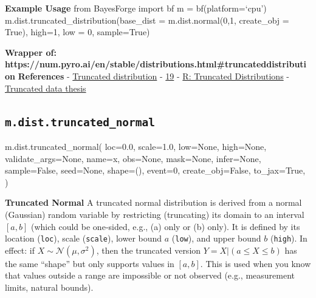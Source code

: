 \documentclass[
  letterpaper,
  DIV=11,
  numbers=noendperiod]{scrartcl}
\newenvironment{Shaded}{\begin{snugshade}}{\end{snugshade}}
\newcommand{\DecValTok}[1]{\textcolor[rgb]{0.68,0.00,0.00}{#1}}
\newcommand{\FloatTok}[1]{\textcolor[rgb]{0.68,0.00,0.00}{#1}}
\newcommand{\NormalTok}[1]{\textcolor[rgb]{0.00,0.23,0.31}{#1}}
\newcommand{\OperatorTok}[1]{\textcolor[rgb]{0.37,0.37,0.37}{#1}}
\newcommand{\StringTok}[1]{\textcolor[rgb]{0.13,0.47,0.30}{#1}}
\newcommand{\VariableTok}[1]{\textcolor[rgb]{0.07,0.07,0.07}{#1}}
\begin{document}
\textbf{Example Usage} from BayesForge import bf m = bf(platform=`cpu')
m.dist.truncated\_distribution(base\_dist = m.dist.normal(0,1,
create\_obj = True), high=1, low = 0, sample=True)

\textbf{Wrapper of:
https://num.pyro.ai/en/stable/distributions.html\#truncateddistribution}
\textbf{References} -
\href{https://en.wikipedia.org/wiki/Truncated_distribution}{Truncated
distribution} -
\href{https://pages.stern.nyu.edu/~wgreene/Text/Edition8/PDF/M19_GREE1366_08_SE_C19.pdf}{19}
-
\href{https://search.r-project.org/CRAN/refmans/LaplacesDemon/html/dist.Truncated.html}{R:
Truncated Distributions} -
\href{https://dspace.cuni.cz/bitstream/handle/20.500.11956/127921/130308341.pdf?isAllowed=y&sequence=1&utm_source.com}{Truncated
data thesis}

\subsection{\texorpdfstring{\texttt{m.dist.truncated\_normal}}{m.dist.truncated\_normal}}\label{truncated_normal}

\begin{Shaded}
\begin{Highlighting}[]
\NormalTok{m.dist.truncated\_normal(}
\NormalTok{    loc}\OperatorTok{=}\FloatTok{0.0}\NormalTok{,}
\NormalTok{    scale}\OperatorTok{=}\FloatTok{1.0}\NormalTok{,}
\NormalTok{    low}\OperatorTok{=}\VariableTok{None}\NormalTok{,}
\NormalTok{    high}\OperatorTok{=}\VariableTok{None}\NormalTok{,}
\NormalTok{    validate\_args}\OperatorTok{=}\VariableTok{None}\NormalTok{,}
\NormalTok{    name}\OperatorTok{=}\StringTok{\textquotesingle{}x\textquotesingle{}}\NormalTok{,}
\NormalTok{    obs}\OperatorTok{=}\VariableTok{None}\NormalTok{,}
\NormalTok{    mask}\OperatorTok{=}\VariableTok{None}\NormalTok{,}
\NormalTok{    infer}\OperatorTok{=}\VariableTok{None}\NormalTok{,}
\NormalTok{    sample}\OperatorTok{=}\VariableTok{False}\NormalTok{,}
\NormalTok{    seed}\OperatorTok{=}\VariableTok{None}\NormalTok{,}
\NormalTok{    shape}\OperatorTok{=}\NormalTok{(),}
\NormalTok{    event}\OperatorTok{=}\DecValTok{0}\NormalTok{,}
\NormalTok{    create\_obj}\OperatorTok{=}\VariableTok{False}\NormalTok{,}
\NormalTok{    to\_jax}\OperatorTok{=}\VariableTok{True}\NormalTok{,}
\NormalTok{)}
\end{Highlighting}
\end{Shaded}

\textbf{Truncated Normal} A truncated normal distribution is derived
from a normal (Gaussian) random variable by restricting (truncating) its
domain to an interval \([a, b]\) (which could be one‐sided, e.g., (a)
only or (b) only). It is defined by its location (\texttt{loc}), scale
(\texttt{scale}), lower bound \(a\) (\texttt{low}), and upper bound
\(b\) (\texttt{high}). In effect: if
\(X \sim \mathcal N(\mu, \sigma^2)\), then the truncated version
\(Y = X | (a \le X \le b)\) has the same ``shape'' but only supports
values in \([a,b]\). This is used when you know that values outside a
range are impossible or not observed (e.g., measurement limits, natural
bounds).
\end{document}
